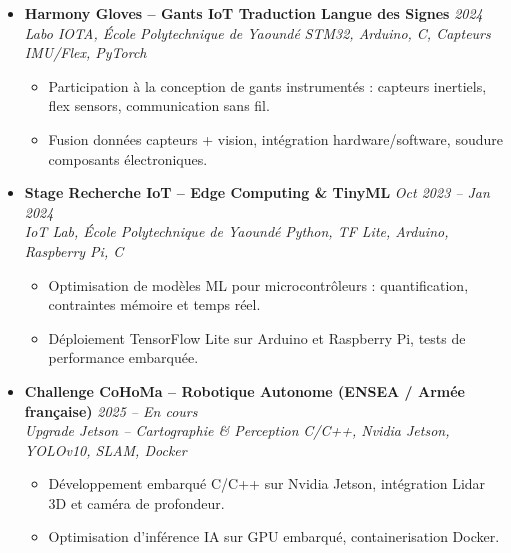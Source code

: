 \documentclass[a4paper,11pt]{article}
\begin{document}
\begin{itemize}[leftmargin=*, label={-}]
\item \textbf{Harmony Gloves -- Gants IoT Traduction Langue des Signes} \hfill \textit{2024} \\
\textit{Labo IOTA, École Polytechnique de Yaoundé} \hfill \textit{STM32, Arduino, C, Capteurs IMU/Flex, PyTorch}
\vspace{-2pt}
    \begin{itemize}[leftmargin=0.4cm, nosep, label=\tiny$\bullet$]
        \item \small{Participation à la conception de gants instrumentés : capteurs inertiels, flex sensors, communication sans fil.}
        \item \small{Fusion données capteurs + vision, intégration hardware/software, soudure composants électroniques.}
    \end{itemize}
\vspace{3pt}

\item \textbf{Stage Recherche IoT -- Edge Computing \& TinyML} \hfill \textit{Oct 2023 -- Jan 2024} \\
\textit{IoT Lab, École Polytechnique de Yaoundé} \hfill \textit{Python, TF Lite, Arduino, Raspberry Pi, C}
\vspace{-2pt}
    \begin{itemize}[leftmargin=0.4cm, nosep, label=\tiny$\bullet$]
        \item \small{Optimisation de modèles ML pour microcontrôleurs : quantification, contraintes mémoire et temps réel.}
        \item \small{Déploiement TensorFlow Lite sur Arduino et Raspberry Pi, tests de performance embarquée.}
    \end{itemize}
\vspace{3pt}

\item \textbf{Challenge CoHoMa -- Robotique Autonome (ENSEA / Armée française)} \hfill \textit{2025 -- En cours} \\
\textit{Upgrade Jetson -- Cartographie \& Perception} \hfill \textit{C/C++, Nvidia Jetson, YOLOv10, SLAM, Docker}
\vspace{-2pt}
    \begin{itemize}[leftmargin=0.4cm, nosep, label=\tiny$\bullet$]
        \item \small{Développement embarqué C/C++ sur Nvidia Jetson, intégration Lidar 3D et caméra de profondeur.}
        \item \small{Optimisation d'inférence IA sur GPU embarqué, containerisation Docker.}
    \end{itemize}
\vspace{3pt}

\end{itemize}
\end{document}

